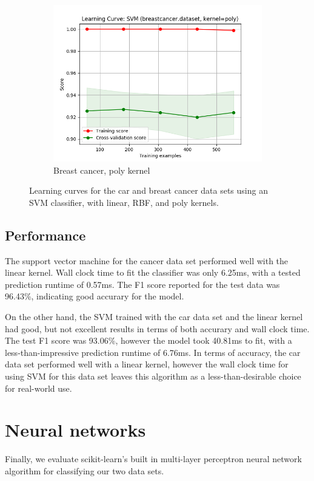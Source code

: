 \documentclass{article}
\begin{document}
\begin{figure}[htb]
\begin{subfigure}{0.33\textwidth}
      \includegraphics[width=\linewidth]{out/svm/breastcancer-kernel-poly.png}
      \caption{Breast cancer, poly kernel}
      \label{fig:svm-learning-6}
    \end{subfigure}

    \caption{Learning curves for the car and breast cancer data sets using an SVM classifier, with linear, RBF, and poly kernels.}
    \label{fig:svm-learning}
    \end{figure}

    \subsection{Performance}
    The support vector machine for the cancer data set performed well with the linear kernel. Wall clock time to fit the classifier was only 6.25ms, with a tested prediction runtime of 0.57ms. The F1 score reported for the test data was 96.43\%, indicating good accurary for the model.

    On the other hand, the SVM trained with the car data set and the linear kernel had good, but not excellent results in terms of both accurary and wall clock time. The test F1 score was 93.06\%, however the model took 40.81ms to fit, with a less-than-impressive prediction runtime of 6.76ms. In terms of accuracy, the car data set performed well with a linear kernel, however the wall clock time for using SVM for this data set leaves this algorithm as a less-than-desirable choice for real-world use.

    \section{Neural networks}
    Finally, we evaluate scikit-learn's built in multi-layer perceptron neural network algorithm for classifying our two data sets.
\end{document}
